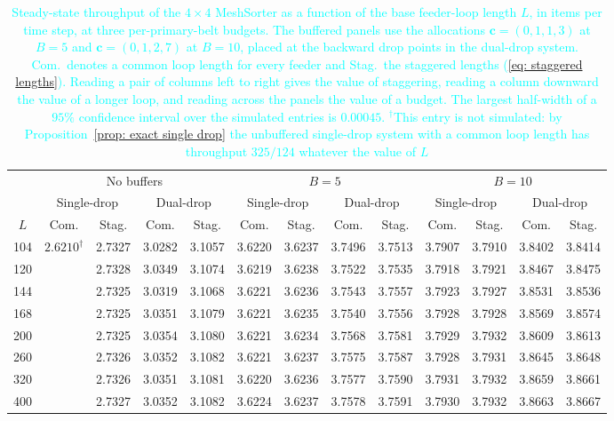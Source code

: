 \begin{table}[!htbp]
\centering
\caption{\textcolor{cyan}{Steady-state throughput of the $4\times4$ MeshSorter
as a function of the base feeder-loop length $L$, in items per time step, at
three per-primary-belt budgets. The buffered panels use the allocations
$\mathbf{c}=(0,1,1,3)$ at $B=5$ and $\mathbf{c}=(0,1,2,7)$ at $B=10$, placed at the backward drop points in the dual-drop system. Com.\ denotes
a common loop length for every feeder and Stag.\ the staggered lengths
(\ref{eq: staggered lengths}). Reading a pair of columns left to right gives the
value of staggering, reading a column downward the value of a longer loop, and
reading across the panels the value of a budget. The largest half-width of a
$95\%$ confidence interval over the simulated entries is $0.00045$.
$^{\dagger}$This entry is not simulated: by
Proposition~\ref{prop: exact single drop} the unbuffered single-drop system with a
common loop length has throughput $325/124$
whatever the value of $L$}}
\label{tab: loop length buffered}
\footnotesize
\setlength{\tabcolsep}{3pt}
\begin{tabular}{c cccc cccc cccc}
\hline
 & \multicolumn{4}{c}{No buffers} & \multicolumn{4}{c}{$B=5$} & \multicolumn{4}{c}{$B=10$}\\
\cline{2-5}\cline{6-9}\cline{10-13}
 & \multicolumn{2}{c}{Single-drop} & \multicolumn{2}{c}{Dual-drop} & \multicolumn{2}{c}{Single-drop} & \multicolumn{2}{c}{Dual-drop} & \multicolumn{2}{c}{Single-drop} & \multicolumn{2}{c}{Dual-drop}\\
\cline{2-3}\cline{4-5}\cline{6-7}\cline{8-9}\cline{10-11}\cline{12-13}
$L$ & Com. & Stag. & Com. & Stag. & Com. & Stag. & Com. & Stag. & Com. & Stag. & Com. & Stag.\\
\hline
104 & \multirow{8}{*}{$2.6210^{\dagger}$} & 2.7327 & 3.0282 & 3.1057 & 3.6220 & 3.6237 & 3.7496 & 3.7513 & 3.7907 & 3.7910 & 3.8402 & 3.8414 \\
120 &  & 2.7328 & 3.0349 & 3.1074 & 3.6219 & 3.6238 & 3.7522 & 3.7535 & 3.7918 & 3.7921 & 3.8467 & 3.8475 \\
144 &  & 2.7325 & 3.0319 & 3.1068 & 3.6221 & 3.6236 & 3.7543 & 3.7557 & 3.7923 & 3.7927 & 3.8531 & 3.8536 \\
168 &  & 2.7325 & 3.0351 & 3.1079 & 3.6221 & 3.6235 & 3.7540 & 3.7556 & 3.7928 & 3.7928 & 3.8569 & 3.8574 \\
200 &  & 2.7325 & 3.0354 & 3.1080 & 3.6221 & 3.6234 & 3.7568 & 3.7581 & 3.7929 & 3.7932 & 3.8609 & 3.8613 \\
260 &  & 2.7326 & 3.0352 & 3.1082 & 3.6221 & 3.6237 & 3.7575 & 3.7587 & 3.7928 & 3.7931 & 3.8645 & 3.8648 \\
320 &  & 2.7326 & 3.0351 & 3.1081 & 3.6220 & 3.6236 & 3.7577 & 3.7590 & 3.7931 & 3.7932 & 3.8659 & 3.8661 \\
400 &  & 2.7327 & 3.0352 & 3.1082 & 3.6224 & 3.6237 & 3.7578 & 3.7591 & 3.7930 & 3.7932 & 3.8663 & 3.8667 \\
\hline
\end{tabular}
\end{table}
